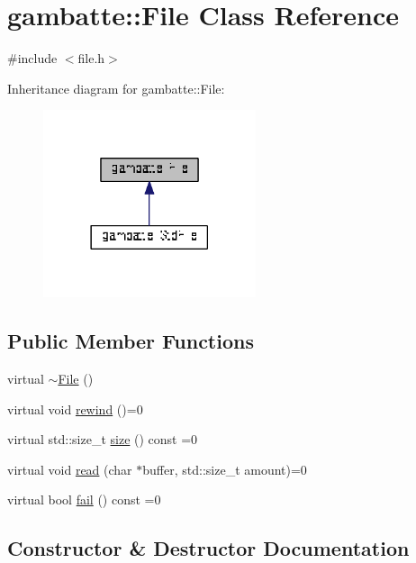 \hypertarget{classgambatte_1_1File}{}\section{gambatte\+:\+:File Class Reference}
\label{classgambatte_1_1File}


{\ttfamily \#include $<$file.\+h$>$}



Inheritance diagram for gambatte\+:\+:File\+:\nopagebreak
\begin{figure}[H]
\begin{center}
\leavevmode
\includegraphics[width=177pt]{classgambatte_1_1File__inherit__graph}
\end{center}
\end{figure}
\subsection*{Public Member Functions}
\begin{DoxyCompactItemize}
\item 
virtual \hyperlink{classgambatte_1_1File_a02609e94947a742b6225b2f2fc828d46}{$\sim$\+File} ()
\item 
virtual void \hyperlink{classgambatte_1_1File_a37e873832be84757982d7a03662dfb95}{rewind} ()=0
\item 
virtual std\+::size\+\_\+t \hyperlink{classgambatte_1_1File_a589f615d436595eb97cbb9b9dc36632e}{size} () const =0
\item 
virtual void \hyperlink{classgambatte_1_1File_a58a6f97f55c93d15c9aa067d2a6db123}{read} (char $\ast$buffer, std\+::size\+\_\+t amount)=0
\item 
virtual bool \hyperlink{classgambatte_1_1File_ac4e6a7055cd91176c9fb3e9215370c51}{fail} () const =0
\end{DoxyCompactItemize}


\subsection{Constructor \& Destructor Documentation}
\mbox{\label{classgambatte_1_1File_a02609e94947a742b6225b2f2fc828d46}} 

